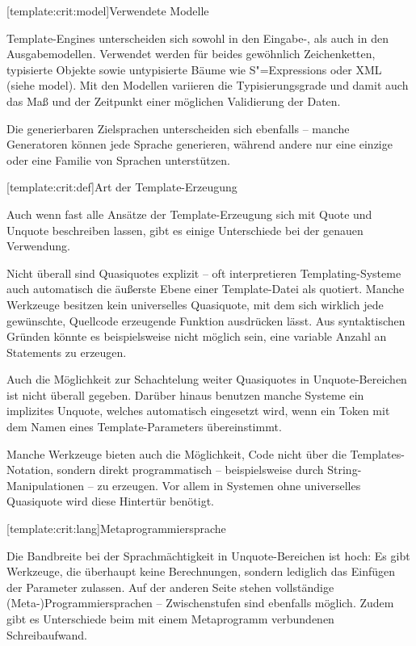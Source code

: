 \documentclass[11pt, a4paper, bibgerm]{scrbook}
\newcommand\lsubsection{}
\newcommand\cref{}
\newcommand{\seec}[1]{(siehe \cref{#1})}
\newcommand{\sexps}{S"=Expressions}
\begin{document}
\lsubsection[template:crit:model]{Verwendete Modelle}

Template-Engines unterscheiden sich sowohl in den Eingabe-, als auch in
den Ausgabemodellen. Verwendet werden für beides gewöhnlich
Zeichenketten, typisierte Objekte sowie untypisierte Bäume wie \sexps{}
oder XML \seec{model}. Mit den Modellen variieren die
Typisierungsgrade und damit auch das Maß und der Zeitpunkt einer
möglichen Validierung der Daten.

Die generierbaren Zielsprachen unterscheiden sich ebenfalls -- manche
Generatoren können jede Sprache generieren, während andere nur eine
einzige oder eine Familie von Sprachen unterstützen.

\lsubsection[template:crit:def]{Art der Template-Erzeugung}

Auch wenn fast alle Ansätze der Template-Erzeugung sich mit Quote und
Unquote beschreiben lassen, gibt es einige Unterschiede bei der genauen
Verwendung.

Nicht überall sind Quasiquotes explizit -- oft interpretieren
Templating-Systeme auch automatisch die äußerste Ebene einer Template-Datei als
quotiert. Manche Werkzeuge besitzen kein universelles
Quasiquote, mit dem sich wirklich jede gewünschte, Quellcode erzeugende
Funktion ausdrücken lässt. Aus syntaktischen Gründen könnte es
beispielsweise nicht möglich sein, eine variable Anzahl an Statements zu
erzeugen.

Auch die Möglichkeit zur Schachtelung weiter Quasiquotes in
Unquote-Bereichen ist nicht überall gegeben. Darüber hinaus benutzen
manche Systeme ein implizites Unquote, welches automatisch
eingesetzt wird, wenn ein Token mit dem Namen eines Template-Parameters
übereinstimmt.

Manche Werkzeuge bieten auch die Möglichkeit, Code nicht über die
Templates-Notation, sondern direkt programmatisch -- beispielsweise durch
String-Manipulationen -- zu erzeugen. Vor allem in Systemen ohne
universelles Quasiquote wird diese Hintertür benötigt.

\lsubsection[template:crit:lang]{Metaprogrammiersprache}

Die Bandbreite bei der Sprachmächtigkeit in Unquote-Bereichen ist hoch:
Es gibt Werkzeuge, die überhaupt keine Berechnungen, sondern lediglich das
Einfügen der Parameter zulassen. Auf der anderen Seite stehen
vollständige (Meta-)Programmiersprachen -- Zwischenstufen sind ebenfalls
möglich. Zudem gibt es Unterschiede beim mit einem Metaprogramm
verbundenen Schreibaufwand.
\end{document}
